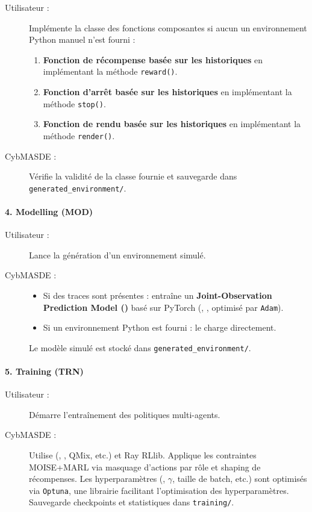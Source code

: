 \begin{description}
  \item[Utilisateur :] Implémente la classe des fonctions composantes si aucun un environnement Python manuel n'est fourni :
    \begin{enumerate}
      \item \textbf{Fonction de récompense basée sur les historiques} en implémentant la méthode \texttt{reward()}.
      \item \textbf{Fonction d'arrêt basée sur les historiques} en implémentant la méthode \texttt{stop()}.
      \item \textbf{Fonction de rendu basée sur les historiques} en implémentant la méthode \texttt{render()}.
    \end{enumerate}
  \item[CybMASDE :] Vérifie la validité de la classe fournie et sauvegarde dans \texttt{generated\_environment/}.
\end{description}

\paragraph{4. Modelling (MOD)}
\begin{description}
  \item[Utilisateur :] Lance la génération d'un environnement simulé.
  \item[CybMASDE :]
    \begin{itemize}
      \item Si des traces sont présentes : entraîne un \textbf{Joint-Observation Prediction Model ()} basé sur PyTorch (, ,  optimisé par \texttt{Adam}).
      \item Si un environnement Python est fourni : le charge directement.
    \end{itemize}
    Le modèle simulé est stocké dans \texttt{generated\_environment/}.
\end{description}

\paragraph{5. Training (TRN)}
\begin{description}
  \item[Utilisateur :] Démarre l'entraînement des politiques multi-agents.
  \item[CybMASDE :] Utilise  (, , QMix, etc.) et Ray RLlib. Applique les contraintes MOISE+MARL via masquage d'actions par rôle et shaping de récompenses. Les hyperparamètres (, $\gamma$, taille de batch, etc.) sont optimisés via \texttt{Optuna}, une librairie facilitant l'optimisation des hyperparamètres. Sauvegarde checkpoints et statistiques dans \texttt{training/}.
\end{description}

